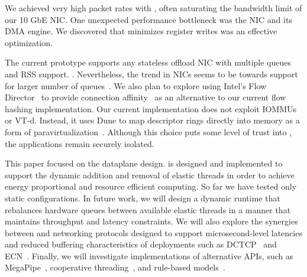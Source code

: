  We achieved very high packet
rates with \ix, often saturating the bandwidth limit of our 10 GbE NIC.
One unexpected performance bottleneck was the NIC and its DMA engine.
We discovered that minimizes register writes was an effective optimization.


 


 The current prototype
supports any stateless offload NIC with multiple queues and RSS
support. . Nevertheless, the
trend in NICs seems to be towards support for larger number of
queues~\cite{radhakrishnan2014senic}. We also plan to explore using Intel's Flow
Director~\cite{intel:82599} to provide connection
affinity~\cite{DBLP:conf/eurosys/PesterevSZM12} as an alternative to
our current flow hashing implementation. Our current implementation
does not exploit IOMMUs or VT-d. Instead, it uses Dune to map
descriptor rings directly into \ix memory as a form of
paravirtualization~\cite{DBLP:conf/sosp/BarhamDFHHHN03}.  Although
this choice puts some level of trust into \ix, the applications remain
securely isolated.

 This paper focused on the \ix dataplane
design. \ix is designed and implemented to support the dynamic
addition and removal of elastic threads in order to achieve energy
proportional and resource efficient computing. So far we have tested
only static configurations. In future work, we will design a dynamic
runtime that rebalances hardware queues between available elastic
threads in a manner that maintains throughput and latency constraints.
%
We will also explore the synergies between \ix and networking
protocols designed to support microsecond-level latencies and reduced
buffering characteristics of \ix deployments such as
DCTCP~\cite{DBLP:conf/sigcomm/AlizadehGMPPPSS10} and
ECN~\cite{ramakrishnan2001addition}. Finally, we will investigate \ix
implementations of alternative APIs, such as
MegaPipe~\cite{DBLP:conf/osdi/HanMCR12}, cooperative
threading~\cite{DBLP:conf/sosp/BehrenCZNB03}, and rule-based
models~\cite{DBLP:conf/hotos/StutsmanO13}.

